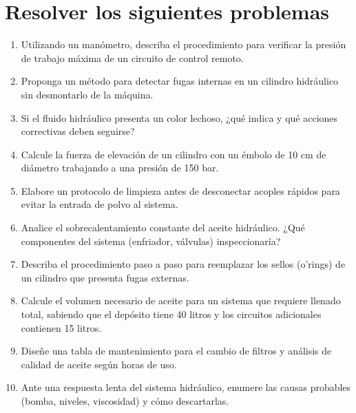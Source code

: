 \section*{\faWrench\space Resolver los siguientes problemas}
\begin{enumerate}
	\item Utilizando un manómetro, describa el procedimiento para verificar la
	      presión de trabajo máxima de un circuito de control remoto.
	\item Proponga un método para detectar fugas internas en un cilindro hidráulico
	      sin desmontarlo de la máquina.
	\item Si el fluido hidráulico presenta un color lechoso, ¿qué indica y qué
	      acciones correctivas deben seguirse?
	\item Calcule la fuerza de elevación de un cilindro con un émbolo de 10 cm de
	      diámetro trabajando a una presión de 150 bar.
	\item Elabore un protocolo de limpieza antes de desconectar acoples rápidos para
	      evitar la entrada de polvo al sistema.
	\item Analice el sobrecalentamiento constante del aceite hidráulico. ¿Qué
	      componentes del sistema (enfriador, válvulas) inspeccionaría?
	\item Describa el procedimiento paso a paso para reemplazar los sellos (o'rings)
	      de un cilindro que presenta fugas externas.
	\item Calcule el volumen necesario de aceite para un sistema que requiere
	      llenado total, sabiendo que el depósito tiene 40 litros y los circuitos
	      adicionales contienen 15 litros.
	\item Diseñe una tabla de mantenimiento para el cambio de filtros y análisis de
	      calidad de aceite según horas de uso.
	\item Ante una respuesta lenta del sistema hidráulico, enumere las causas
	      probables (bomba, niveles, viscosidad) y cómo descartarlas.
\end{enumerate}
